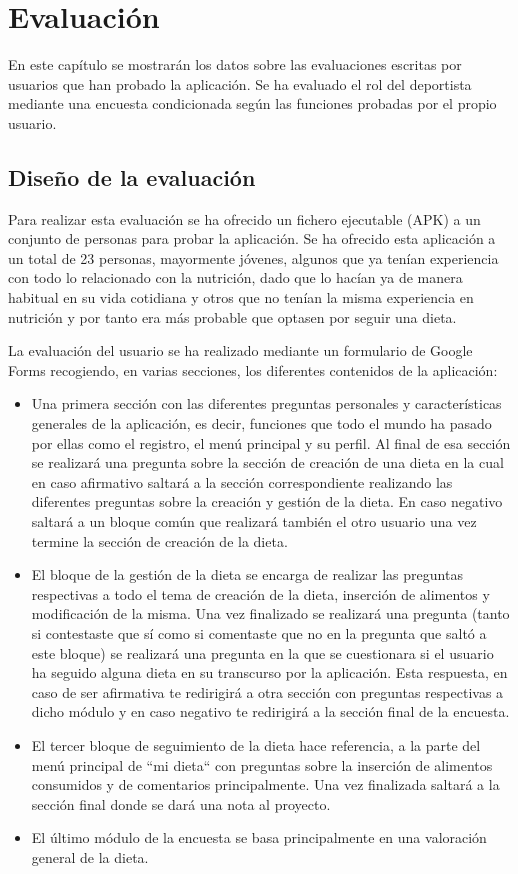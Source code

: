 \chapter{Evaluación}
\noindent
En este capítulo se mostrarán los datos sobre las evaluaciones escritas por usuarios que han probado la aplicación. Se ha evaluado el rol del deportista mediante una encuesta condicionada según las funciones probadas por el propio usuario.

\section{Diseño de la evaluación}
Para realizar esta evaluación se ha ofrecido un fichero ejecutable (APK) a un conjunto de personas para probar la aplicación. Se ha ofrecido esta aplicación a un total de 23 personas, mayormente jóvenes, algunos que ya tenían experiencia con todo lo relacionado con la nutrición, dado que lo hacían ya de manera habitual en su vida cotidiana y otros que no tenían la misma experiencia en nutrición y por tanto era más probable que optasen por seguir una dieta. 

La evaluación del usuario se ha realizado mediante un formulario de Google Forms \cite{googleForm} recogiendo, en varias secciones, los diferentes contenidos de la aplicación:

\begin{itemize}
    \item Una primera sección con las diferentes preguntas personales y características generales de la aplicación, es decir, funciones que todo el mundo ha pasado por ellas como el registro, el menú principal y su perfil. Al final de esa sección se realizará una pregunta sobre la sección de creación de una dieta en la cual en caso afirmativo saltará a la sección correspondiente realizando las diferentes preguntas sobre la creación y gestión de la dieta. En caso negativo saltará a un bloque común que realizará también el otro usuario una vez termine la sección de creación de la dieta.
    \item El bloque de la gestión de la dieta se encarga de realizar las preguntas respectivas a todo el tema de creación de la dieta, inserción de alimentos y modificación de la misma. Una vez finalizado se realizará una pregunta (tanto si contestaste que sí como si comentaste que no en la pregunta que saltó a este bloque) se realizará una pregunta en la que se cuestionara si el usuario ha seguido alguna dieta en su transcurso por la aplicación. Esta respuesta, en caso de ser afirmativa te redirigirá a otra sección con preguntas respectivas a dicho módulo y en caso negativo te redirigirá a la sección final de la encuesta.
    \item El tercer bloque de seguimiento de la dieta hace referencia, a la parte del menú principal de ``mi dieta`` con preguntas sobre la inserción de alimentos consumidos y de comentarios principalmente. Una vez finalizada saltará a la sección final donde se dará una nota al proyecto.
    \item El último módulo de la encuesta se basa principalmente en una valoración general de la dieta.
\end{itemize}

